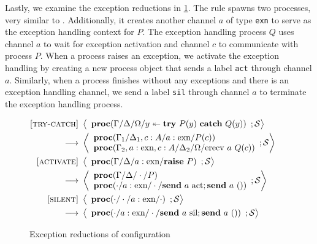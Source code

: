 \documentclass[12pt, openany]{memoir}
\newcommand*{\send}[2]{\textbf{send}\ #1\ #2}
\newcommand*{\craise}[1]{\textbf{raise}\ #1}
\newcommand*{\trycatch}[3]{#3 \twoheadleftarrow	\textbf{try}\ #1(#3)\ \textbf{catch}\ #2(#3)}
\newcommand*{\procObj}[4]{\textbf{proc}(#1/#2/#3/#4)}
\newcommand*{\cancelSet}[0]{\mathcal{S}}
\begin{document}
Lastly, we examine the exception reductions in \cref{fig:exnreduction}. 
The  rule spawns two processes, very similar to . 
Additionally, it creates another channel $a$ of type \texttt{exn} to serve as the exception handling context for $P$. 
The exception handling process $Q$ uses channel $a$ to wait for exception activation and channel $c$ to communicate with process $P$.
When a process raises an exception, we activate the exception handling by creating a new process object that sends a label \texttt{act} through channel $a$. 
Similarly, when a process finishes without any exceptions and there is an exception handling channel, we send a label \texttt{sil} through channel $a$ to terminate the exception handling process.
\begin{figure}[H]
  \begin{alignat}{2}
    \label{try-catch} \textsc{[try-catch]} & ~ 
    \Braket{
      \begin{array}{l}
        \procObj{\Gamma}{\Delta}{\Omega}{\trycatch{P}{Q}{y}}
      \end{array}
      ; \cancelSet
    } \tag*{} \\ ~ \longrightarrow & ~ 
    \Braket{
      \begin{array}{l}
        \procObj{\Gamma_1}{\Delta_1, c : A}{a : \text{exn}}{P(c)} \\
        \procObj{\Gamma_2, a : \text{exn}, c : A}{\Delta_2}{\Omega}{\text{erecv}\ a\ Q(c)}
      \end{array}
      ; \cancelSet
    } \tag*{} \\
    \label{activation} \textsc{[activate]} & ~ 
    \Braket{
      \begin{array}{l}
        \procObj{\Gamma}{\Delta}{a : \text{exn}}{\craise{P}}
      \end{array}
      ; \cancelSet
    } \tag*{} \\ ~ \longrightarrow & ~ 
    \Braket{
      \begin{array}{l}
        \procObj{\Gamma}{\Delta}{\cdot}{P} \\
        \procObj{\cdot}{a : \text{exn}}{\cdot}{\send{a}{\text{act}}; \send{a}{()}}
      \end{array}
      ; \cancelSet
    } \tag*{} \\
    \label{silence} \textsc{[silent]} & ~ 
    \Braket{
      \begin{array}{l}
        \procObj{\cdot}{\cdot}{a : \text{exn}}{\cdot}
      \end{array}
      ; \cancelSet
    } \tag*{} \\ ~ \longrightarrow & ~ 
    \Braket{
      \begin{array}{l}
        \procObj{\cdot}{a : \text{exn}}{\cdot}{\send{a}{\text{sil}}; \send{a}{()}}
      \end{array}
      ; \cancelSet
    } \tag*{}
  \end{alignat}
  \raggedleft
  \caption{Exception reductions of configuration}
  \label{fig:exnreduction}
\end{figure}
\newpage
\end{document}
